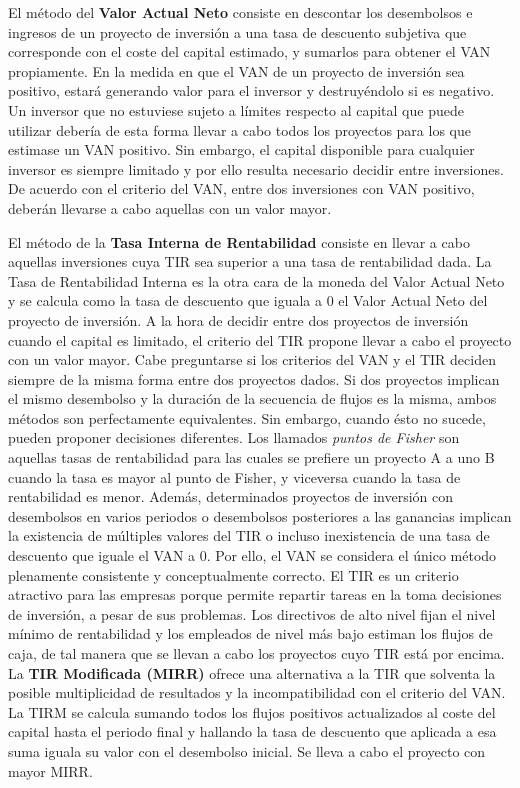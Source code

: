 \documentclass{nuevotema}
\begin{document}
El método del \textbf{Valor Actual Neto} consiste en descontar los desembolsos e ingresos de un proyecto de inversión a una tasa de descuento subjetiva que corresponde con el coste del capital estimado, y sumarlos para obtener el VAN propiamente. En la medida en que el VAN de un proyecto de inversión sea positivo, estará generando valor para el inversor y destruyéndolo si es negativo. Un inversor que no estuviese sujeto a límites respecto al capital que puede utilizar debería de esta forma llevar a cabo todos los proyectos para los que estimase un VAN positivo. Sin embargo, el capital disponible para cualquier inversor es siempre limitado y por ello resulta necesario decidir entre inversiones. De acuerdo con el criterio del VAN, entre dos inversiones con VAN positivo, deberán llevarse a cabo aquellas con un valor mayor. 

El método de la \textbf{Tasa Interna de Rentabilidad} consiste en llevar a cabo aquellas inversiones cuya TIR sea superior a una tasa de rentabilidad dada. La Tasa de Rentabilidad Interna es la otra cara de la moneda del Valor Actual Neto y se calcula como la tasa de descuento que iguala a 0 el Valor Actual Neto del proyecto de inversión. A la hora de decidir entre dos proyectos de inversión cuando el capital es limitado, el criterio del TIR propone llevar a cabo el proyecto con un valor mayor. Cabe preguntarse si los criterios del VAN y el TIR deciden siempre de la misma forma entre dos proyectos dados. Si dos proyectos implican el mismo desembolso y la duración de la secuencia de flujos es la misma, ambos métodos son perfectamente equivalentes. Sin embargo, cuando ésto no sucede, pueden proponer decisiones diferentes. Los llamados \textit{puntos de Fisher} son aquellas tasas de rentabilidad para las cuales se prefiere un proyecto A a uno B cuando la tasa es mayor al punto de Fisher, y viceversa cuando la tasa de rentabilidad es menor. Además, determinados proyectos de inversión con desembolsos en varios periodos o desembolsos posteriores a las ganancias implican la existencia de múltiples valores del TIR o incluso inexistencia de una tasa de descuento que iguale el VAN a 0. Por ello, el VAN se considera el único método plenamente consistente y conceptualmente correcto. El TIR es un criterio atractivo para las empresas porque permite repartir tareas en la toma decisiones de inversión, a pesar de sus problemas. Los directivos de alto nivel fijan el nivel mínimo de rentabilidad y los empleados de nivel más bajo estiman los flujos de caja, de tal manera que se llevan a cabo los proyectos cuyo TIR está por encima. La \textbf{TIR Modificada (MIRR)} ofrece una alternativa a la TIR que solventa la posible multiplicidad de resultados y la incompatibilidad con el criterio del VAN. La TIRM se calcula sumando todos los flujos positivos actualizados al coste del capital hasta el periodo final y hallando la tasa de descuento que aplicada a esa suma iguala su valor con el desembolso inicial. Se lleva a cabo el proyecto con mayor MIRR.
\end{document}
